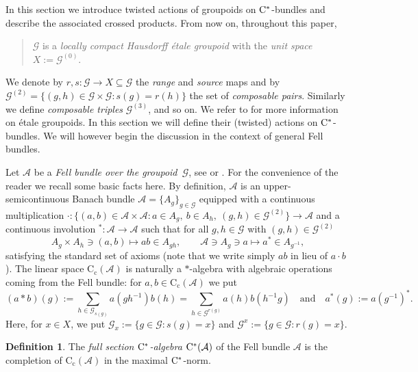 \documentclass[11 pt, leqno]{amsart}
\numberwithin{equation}{section}
\theoremstyle{plain}
\theoremstyle{definition}
\newtheorem {defn}[thm] {Definition}
\newcommand*{\contc}{\mathrm{C_c}}%
\newcommand*{\rg}{r}%
\renewcommand{\star}{*}
\newcommand{\G}{\mathcal G} %
\newcommand{\A}{\mathcal A}
\newcommand{\cst}{\ifmmode\mathrm{C}^*\else{$\mathrm{C}^*$}\fi}
\begin{document}
In this section we introduce twisted actions of groupoids on $\cst$-bundles and describe the associated crossed products. From now on, throughout this paper, 
\begin{quote}
	$\G$ is a \emph{locally compact Hausdorff \'{e}tale groupoid} with the \emph{unit space} $X:=\G^{(0)}$. 
\end{quote}
\noindent
We denote by $r,s:\G\to X\subseteq \G$ the \emph{range} and \emph{source} maps and by $\G^{(2)}=\{(g,h)\in \G\times \G: s(g)=r(h)\}$ the set of \emph{composable pairs}. 
Similarly we define \emph{composable triples} $\G^{(3)}$, and so on. 
We refer to \cite{Renault0,Exel:combinatorial,Sims} for more information on \'etale groupoids. 
In this section we will define their (twisted) actions on $\cst$-bundles. 
We will however begin the discussion in the context of general Fell bundles.

Let $\A$ be a \emph{Fell bundle over the groupoid~$\G$}, see \cite[Section 2]{BussExel} or \cite{Kumjian,Takeishi}. 
For the convenience of the reader we recall some basic facts here. 
By definition, $\A$ is an upper-semicontinuous Banach bundle $\A=\{A_g\}_{g\in \G}$ equipped with a  continuous multiplication ${\cdot}: \{(a,b)\in \A\times \A : a\in A_{g},\ b \in A_{h},\ (g,h)\in \G^{(2)}\} \to \A$ and a continuous involution
$ ^{\star}: \A\to \A$ such that for all $g,h \in \G$ with $(g,h) \in \G^{(2)}$
\[
    A_{g}\times A_h\ni (a,b)\mapsto a b\in A_{gh}, \qquad 	\A\ni A_g\ni a\mapsto a^{\star}\in A_{g^{-1}},  
\]
satisfying the standard set of axioms (note that we write simply $ab$ in lieu of $a \cdot b$). 
The linear space $\contc(\A)$ is naturally a $*$-algebra with algebraic operations coming from the Fell bundle: for $a,b\in \contc(\A)$ we put
\[
    (a*b)(g) := \sum_{h\in \G_{s(g)}} a(gh^{-1}) b(h)=\sum_{h\in \G^{\rg(g)}} a(h) b(h^{-1}g) \quad \text{and} \quad  a^*(g):= a(g^{-1})^{\star}.
\]
Here, for $x \in X$, we put $\G_x:=\{g \in \G : s(g) = x \}$ and $\G^x := \{ g\in \G : \rg(g) = x \}$.

\begin{defn} 
The \emph{full section $\cst$-algebra} $\cst(\A)$ of the Fell bundle $\A$ is the completion of $\contc(\A)$ in the maximal $\cst$-norm.
\end{defn} 
\end{document}
